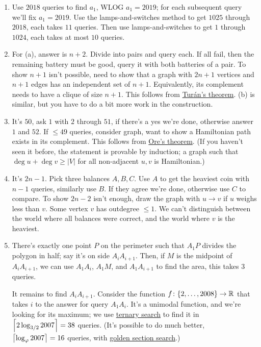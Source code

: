 \documentclass[11pt,paper=letter]{scrartcl}
\begin{document}
\begin{enumerate}
\item Use $2018$ queries to find $a_1$, WLOG $a_1 = 2019$; for each subsequent query we'll fix $a_1 = 2019$. Use the lamps-and-switches method to get $1025$ through $2018$, each takes $11$ queries. Then use lamps-and-switches to get $1$ through $1024$, each takes at most $10$ queries.

\item For (a), answer is $n + 2$. Divide into pairs and query each. If all fail, then the remaining battery must be good, query it with both batteries of a pair. To show $n + 1$ isn't possible, need to show that a graph with $2n + 1$ vertices and $n + 1$ edges has an independent set of $n + 1$. Equivalently, its complement needs to have a clique of size $n + 1$. This follows from \href{https://en.wikipedia.org/wiki/Turán's_theorem}{Tur\'an's theorem}. (b) is similar, but you have to do a bit more work in the construction.

\item It's $50$, ask $1$ with $2$ through $51$, if there's a yes we're done, otherwise answer $1$ and $52$. If $\le 49$ queries, consider graph, want to show a Hamiltonian path exists in its complement. This follows from \href{https://en.wikipedia.org/wiki/Ore's_theorem}{Ore's theorem}. (If you haven't seen it before, the statement is provable by induction; a graph such that $\deg u + \deg v \ge |V|$ for all non-adjacent $u, v$ is Hamiltonian.)

\item It's $2n - 1$. Pick three balances $A, B, C$. Use $A$ to get the heaviest coin with $n - 1$ queries, similarly use $B$. If they agree we're done, otherwise use $C$ to compare. To show $2n - 2$ isn't enough, draw the graph with $u \to v$ if $u$ weighs less than $v$. Some vertex $v$ has outdegree $\le 1$. We can't distinguish between the world where all balances were correct, and the world where $v$ is the heaviest.

\item There's exactly one point $P$ on the perimeter such that $A_1P$ divides the polygon in half; say it's on side $A_iA_{i+1}$. Then, if $M$ is the midpoint of $A_iA_{i+1}$, we can use $A_1A_i$, $A_1M$, and $A_1A_{i+1}$ to find the area, this takes $3$ queries.

It remains to find $A_iA_{i+1}$. Consider the function $f \colon \{2, \ldots, 2008\} \to \mathbb R$ that takes $i$ to the answer for query $A_1A_i$. It's a unimodal function, and we're looking for its maximum; we use \href{https://en.wikipedia.org/wiki/Ternary_search}{ternary search} to find it in $\left\lceil 2\log_{3/2}2007 \right\rceil = 38$ queries. (It's possible to do much better, $\left\lceil \log_{\varphi}2007 \right\rceil = 16$ queries, with \href{https://en.wikipedia.org/wiki/Golden-section_search}{golden section search}.)


\end{enumerate}
\end{document}
